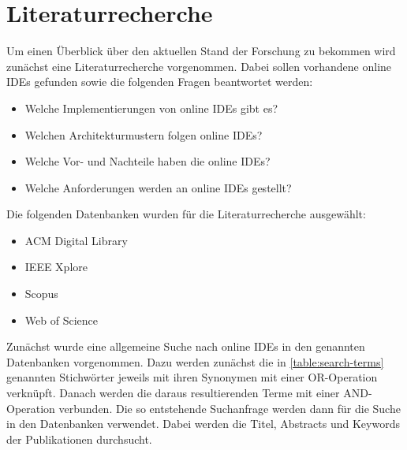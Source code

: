 \section{Literaturrecherche} \label{stand-der-technik-literaturrecherche}

Um einen Überblick über den aktuellen Stand der Forschung zu bekommen wird zunächst eine Literaturrecherche vorgenommen. Dabei sollen vorhandene online IDEs gefunden sowie die folgenden Fragen beantwortet werden:

\begin{itemize}
    \item Welche Implementierungen von online IDEs gibt es?
    \item Welchen Architekturmustern folgen online IDEs?
    \item Welche Vor- und Nachteile haben die online IDEs?
    \item Welche Anforderungen werden an online IDEs gestellt?
\end{itemize}

Die folgenden Datenbanken wurden für die Literaturrecherche ausgewählt:

\begin{itemize}
    \item ACM Digital Library
    \item IEEE Xplore
    \item Scopus
    \item Web of Science
\end{itemize}

Zunächst wurde eine allgemeine Suche nach online IDEs in den genannten Datenbanken vorgenommen. Dazu werden zunächst die in \autoref{table:search-terms} genannten Stichwörter jeweils mit ihren Synonymen mit einer OR-Operation verknüpft. Danach werden die daraus resultierenden Terme mit einer AND-Operation verbunden. Die so entstehende Suchanfrage werden dann für die Suche in den Datenbanken verwendet. Dabei werden die Titel, Abstracts und Keywords der Publikationen durchsucht.

